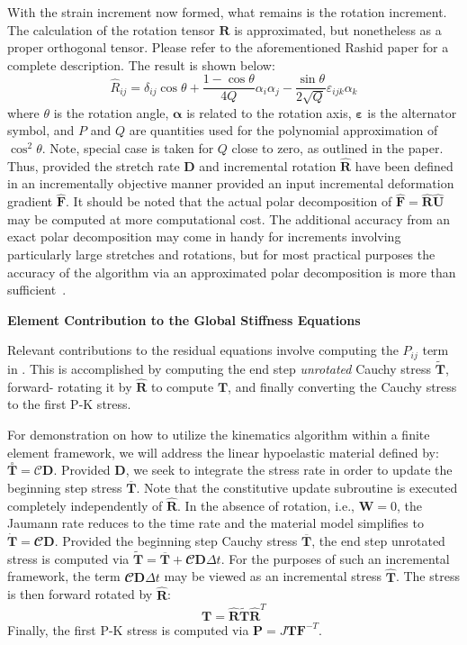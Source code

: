 With the strain increment now formed, what remains is the rotation increment. The calculation of the rotation tensor $\mathbf{R}$ is approximated, but nonetheless as a proper orthogonal tensor. Please refer to the aforementioned Rashid paper for a complete description. The result is shown below:
\begin{equation}
\hat{R}_{ij} = \delta_{ij}\cos\theta + \frac{1 - \cos \theta}{4Q}\alpha_i\alpha_j - \frac{\sin\theta}{2\sqrt{Q}}\varepsilon_{ijk}\alpha_{k}
\end{equation}
where $\theta$ is the rotation angle, $\boldsymbol{\alpha}$ is related to the rotation axis, $\boldsymbol{\varepsilon}$ is the alternator symbol, and $P$ and $Q$ are quantities used for the polynomial approximation of $\cos^2\theta$. Note, special case is taken for $Q$ close to zero, as outlined in the paper. Thus, provided the stretch rate $\bm{D}$ and incremental rotation $\hat{\bm{R}}$ have been defined in an incrementally objective manner provided an input incremental deformation gradient $\hat{\bm{F}}$.  It should be noted that the actual polar decomposition of $\hat{\bm{F}} = \hat{\bm{R}}\hat{\bm{U}}$ may be computed at more computational cost. The additional accuracy from an exact polar decomposition may come in handy for increments involving particularly large stretches and rotations, but for most practical purposes the accuracy of the algorithm via an approximated polar decomposition is more than sufficient~\cite{rashid_1993}.

\textbf{Element Contribution to the Global Stiffness Equations}

Relevant contributions to the residual equations involve computing the $P_{ij}$ term in . This is accomplished by computing the end step \textit{unrotated} Cauchy stress $\tilde{\bm{T}}$, forward- rotating it by $\hat{\bm{R}}$ to compute $\bm{T}$, and finally converting the Cauchy stress to the first P-K stress.

For demonstration on how to utilize the kinematics algorithm within a finite element framework, we will address the linear hypoelastic material defined by: $\overset{\circ}{\bm{T}} = \bm{\mathcal{C}}\bm{D}$. Provided $\bm{D}$, we seek to integrate the stress rate in order to update the beginning step stress $\overline{\bm{T}}$. Note that the constitutive update subroutine is executed completely independently of $\hat{\bm{R}}$. In the absence of rotation, i.e., $\bm{W} = 0$, the Jaumann rate reduces to the time rate and the material model simplifies to $\dot{\bm{T}} = \mathbfcal{C}\bm{D}$. Provided the beginning step Cauchy stress $\overline{\bm{T}}$, the end step unrotated stress is computed via $\tilde{\bm{T}} = \overline{\bm{T}} + \mathbfcal{C}\bm{D}\Delta{t}$. For the purposes of such an incremental framework, the term $\mathbfcal{C}\bm{D}\Delta{t}$ may be viewed as an incremental stress $\hat{\bm{T}}$. The stress is then forward rotated by $\hat{\bm{R}}$:
\begin{equation}
\bm{T} = \hat{\bm{R}}\tilde{\bm{T}}\hat{\bm{R}}^T
\end{equation}
Finally, the first P-K stress is computed via $\bm{P} = J\bm{T}\bm{F}^{-T}$.

